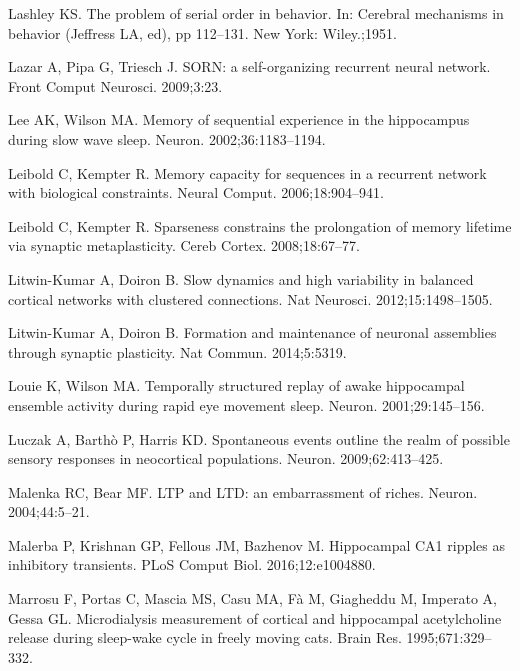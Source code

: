 \begin{thebibliography}{}
Lashley KS.
\newblock The problem of serial order in behavior.
In: Cerebral mechanisms in behavior (Jeffress LA, ed), pp 112--131.
\newblock New York: Wiley.;1951.

Lazar A, Pipa G, Triesch J.
\newblock SORN: a self-organizing recurrent neural network.
\newblock Front Comput Neurosci. 2009;3:23.

Lee AK, Wilson MA.
\newblock Memory of sequential experience in the hippocampus during slow wave
  sleep.
\newblock Neuron. 2002;36:1183--1194.

Leibold C, Kempter R.
\newblock Memory capacity for sequences in a recurrent network with biological constraints.
\newblock Neural Comput. 2006;18:904--941.

Leibold C, Kempter R.
\newblock Sparseness constrains the prolongation of memory lifetime via synaptic metaplasticity.
\newblock Cereb Cortex. 2008;18:67--77.

Litwin-Kumar A, Doiron B.
\newblock Slow dynamics and high variability in balanced cortical networks with clustered connections.
\newblock Nat Neurosci. 2012;15:1498--1505.

Litwin-Kumar A, Doiron B.
\newblock Formation and maintenance of neuronal assemblies through synaptic plasticity.
\newblock Nat Commun. 2014;5:5319.

Louie K, Wilson MA.
\newblock Temporally structured replay of awake hippocampal ensemble activity during rapid eye movement sleep.
\newblock Neuron. 2001;29:145--156.

  Luczak A, Barth{\`o} P, Harris KD.
\newblock Spontaneous events outline the realm of possible sensory responses in neocortical populations.
\newblock Neuron. 2009;62:413--425.

Malenka RC, Bear MF.
\newblock LTP and LTD: an embarrassment of riches.
\newblock Neuron. 2004;44:5--21.

Malerba P, Krishnan GP, Fellous JM, Bazhenov M.
\newblock Hippocampal CA1 ripples as inhibitory transients.
\newblock PLoS Comput Biol. 2016;12:e1004880.

Marrosu F, Portas C, Mascia MS, Casu MA, F{\`a} M, Giagheddu M, Imperato A, Gessa GL.
\newblock Microdialysis measurement of cortical and hippocampal acetylcholine
  release during sleep-wake cycle in freely moving cats.
\newblock Brain Res. 1995;671:329--332.


\end{thebibliography}
